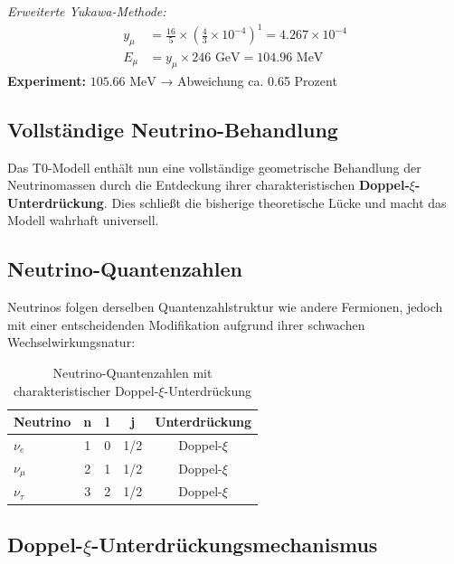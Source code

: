 \textit{Erweiterte Yukawa-Methode:}
\begin{align}
	y_\mu &= \frac{16}{5} \times \left(\frac{4}{3} \times 10^{-4}\right)^1 = 4.267 \times 10^{-4} \\
	E_\mu &= y_\mu \times 246 \text{ GeV} = 104.96 \text{ MeV}
\end{align}
\textbf{Experiment:} $105.66 \text{ MeV}$ → Abweichung ca. 0.65 Prozent

\subsection{Vollständige Neutrino-Behandlung}
\label{sec:complete_neutrino_treatment}

\begin{neutrino}
	Das T0-Modell enthält nun eine vollständige geometrische Behandlung der Neutrinomassen durch die Entdeckung ihrer charakteristischen \textbf{Doppel-$\xi$-Unterdrückung}. Dies schließt die bisherige theoretische Lücke und macht das Modell wahrhaft universell.
\end{neutrino}

\subsection{Neutrino-Quantenzahlen}
\label{subsec:neutrino_quantum_numbers}

Neutrinos folgen derselben Quantenzahlstruktur wie andere Fermionen, jedoch mit einer entscheidenden Modifikation aufgrund ihrer schwachen Wechselwirkungsnatur:

\begin{table}[H]
	\centering
	\begin{tabular}{lcccc}
		\toprule
		\textbf{Neutrino} & \textbf{n} & \textbf{l} & \textbf{j} & \textbf{Unterdrückung} \\
		\midrule
		$\nu_e$ & 1 & 0 & 1/2 & Doppel-$\xi$ \\
		$\nu_\mu$ & 2 & 1 & 1/2 & Doppel-$\xi$ \\
		$\nu_\tau$ & 3 & 2 & 1/2 & Doppel-$\xi$ \\
		\bottomrule
	\end{tabular}
	\caption{Neutrino-Quantenzahlen mit charakteristischer Doppel-$\xi$-Unterdrückung}
	\label{tab:neutrino_quantum_numbers}
\end{table}

\subsection{Doppel-$\xi$-Unterdrückungsmechanismus}
\label{subsec:double_xi_suppression}

